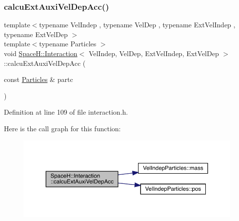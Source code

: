 \subsubsection{\texorpdfstring{calcu\+Ext\+Auxi\+Vel\+Dep\+Acc()}{calcuExtAuxiVelDepAcc()}}
{\footnotesize\ttfamily template$<$typename Vel\+Indep , typename Vel\+Dep , typename Ext\+Vel\+Indep , typename Ext\+Vel\+Dep $>$ \\
template$<$typename Particles $>$ \\
void \mbox{\hyperlink{class_space_h_1_1_interaction}{Space\+H\+::\+Interaction}}$<$ Vel\+Indep, Vel\+Dep, Ext\+Vel\+Indep, Ext\+Vel\+Dep $>$\+::calcu\+Ext\+Auxi\+Vel\+Dep\+Acc (\begin{DoxyParamCaption}\item[{const \mbox{\hyperlink{struct_particles}{Particles}} \&}]{partc }\end{DoxyParamCaption})\hspace{0.3cm}{\ttfamily [inline]}}



Definition at line 109 of file interaction.\+h.

Here is the call graph for this function\+:\nopagebreak
\begin{figure}[H]
\begin{center}
\leavevmode
\includegraphics[width=350pt]{class_space_h_1_1_interaction_a29ebcdb5fb80bea1f0bc2de302a6cb15_cgraph}
\end{center}
\end{figure}
\mbox{\label{class_space_h_1_1_interaction_a171fc6ed61d1e4d842df56d150c5d2ca}} 
